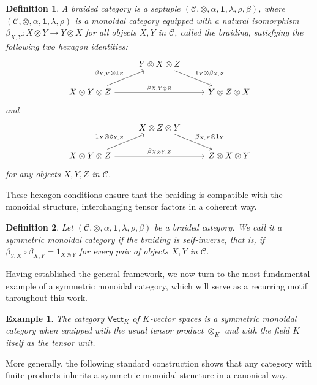 \documentclass{amsart}
\newcommand{\Vect}{\mathsf{Vect}}
\newcommand{\VectK}{\Vect_K}
\newtheorem{definition}{Definition}[section]
\newtheorem{example}{Example}[section]
\begin{document}
\begin{definition}\label{def:braided}
A braided category is a septuple $(\mathcal{C},\otimes,\alpha,\mathbf{1},\lambda,\rho,\beta)$, where $(\mathcal{C},\otimes,\alpha,\mathbf{1},\lambda,\rho)$ is a monoidal category equipped with a natural isomorphism $\beta_{X,Y}\colon X\otimes Y\longrightarrow Y\otimes X$ for all objects $X,Y$ in $\mathcal{C}$, called the braiding, satisfying the following two hexagon identities:
\[
\begin{tikzcd}
 & Y\otimes X\otimes Z\arrow{dr}{1_Y\otimes\beta_{X, Z}}\\
X\otimes Y\otimes Z  \arrow{ur}{\beta_{X,Y}\otimes 1_Z} \arrow{rr}{\beta_{X,Y\otimes Z}} && Y\otimes Z\otimes X
\end{tikzcd}
\label{eq:hexagon1}
\]
and
\[
\begin{tikzcd}
 & X\otimes Z\otimes Y\arrow{dr}{\beta_{X, Z}\otimes 1_Y}\\
X\otimes Y\otimes Z  \arrow{ur}{1_X\otimes \beta_{Y,Z}} \arrow{rr}{\beta_{X\otimes Y,Z}} && Z\otimes X\otimes Y
\end{tikzcd}
\label{eq:hexagon2}
\]
for any objects $X,Y,Z$ in $\mathcal{C}$.
\end{definition}

These hexagon conditions ensure that the braiding is compatible with the monoidal structure, interchanging tensor factors in a coherent way.

\begin{definition}\label{def:symmetric}
Let $(\mathcal{C},\otimes,\alpha,\mathbf{1},\lambda,\rho,\beta)$ be a braided category. We call it a symmetric monoidal category if the braiding is self-inverse, that is, if $\beta_{Y,X}\circ\beta_{X,Y} = 1_{X\otimes Y}$ for every pair of objects $X,Y$ in $\mathcal{C}$.
\end{definition}

Having established the general framework, we now turn to the most fundamental example of a symmetric monoidal category, which will serve as a recurring motif throughout this work.

\begin{example}\label{ex:vect}
The category $\VectK$ of $K$-vector spaces is a symmetric monoidal category when equipped with the usual tensor product $\otimes_K$ and with the field $K$ itself as the tensor unit.
\end{example}

More generally, the following standard construction shows that any category with finite products inherits a symmetric monoidal structure in a canonical way.
\end{document}
